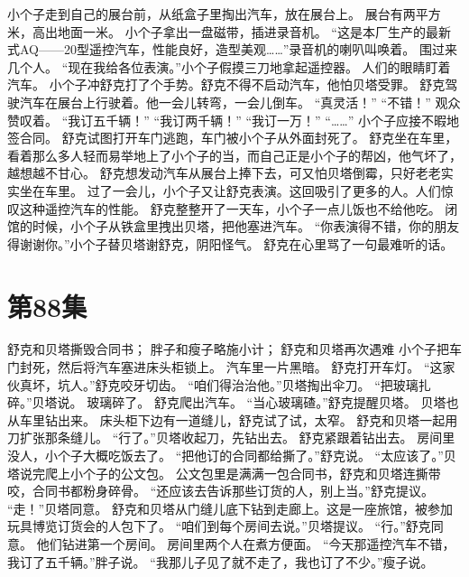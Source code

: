 \documentclass[a4paper,12pt,UTF8,twoside]{ctexbook}
\begin{document}
        小个子走到自己的展台前，从纸盒子里掏出汽车，放在展台上。 
        展台有两平方米，高出地面一米。 
        小个子拿出一盘磁带，插进录音机。 
        “这是本厂生产的最新式AQ——20型遥控汽车，性能良好，造型美观……”录音机的喇叭叫唤着。 
        围过来几个人。 
        “现在我给各位表演。”小个子假摸三刀地拿起遥控器。 
        人们的眼睛盯着汽车。 
        小个子冲舒克打了个手势。舒克不得不启动汽车，他怕贝塔受罪。 
        舒克驾驶汽车在展台上行驶着。他一会儿转弯，一会儿倒车。 
        “真灵活！” 
        “不错！” 
        观众赞叹着。 
        “我订五千辆！” 
        “我订两千辆！” 
        “我订一万！” 
        “……” 
        小个子应接不暇地签合同。 
        舒克试图打开车门逃跑，车门被小个子从外面封死了。 
        舒克坐在车里，看着那么多人轻而易举地上了小个子的当，而自己正是小个子的帮凶，他气坏了，越想越不甘心。 
        舒克想发动汽车从展台上捧下去，可又怕贝塔倒霉，只好老老实实坐在车里。 
        过了一会儿，小个子又让舒克表演。这回吸引了更多的人。人们惊叹这种遥控汽车的性能。 
        舒克整整开了一天车，小个子一点儿饭也不给他吃。 
        闭馆的时候，小个子从铁盒里拽出贝塔，把他塞进汽车。 
        “你表演得不错，你的朋友得谢谢你。”小个子替贝塔谢舒克，阴阳怪气。 
        舒克在心里骂了一句最难听的话。       \chapter{第88集} 
        舒克和贝塔撕毁合同书； 
        胖子和瘦子略施小计； 
        舒克和贝塔再次遇难   
        小个子把车门封死，然后将汽车塞进床头柜锁上。 
        汽车里一片黑暗。 
        舒克打开车灯。 
        “这家伙真坏，坑人。”舒克咬牙切齿。 
        “咱们得治治他。”贝塔掏出伞刀。 
        “把玻璃扎碎。”贝塔说。 
        玻璃碎了。 
        舒克爬出汽车。 
        “当心玻璃碴。”舒克提醒贝塔。 
        贝塔也从车里钻出来。 
        床头柜下边有一道缝儿，舒克试了试，太窄。 
        舒克和贝塔一起用刀扩张那条缝儿。 
        “行了。”贝塔收起刀，先钻出去。 
        舒克紧跟着钻出去。 
        房间里没人，小个子大概吃饭去了。 
        “把他订的合同都给撕了。”舒克说。 
        “太应该了。”贝塔说完爬上小个子的公文包。 
        公文包里是满满一包合同书，舒克和贝塔连撕带咬，合同书都粉身碎骨。 
        “还应该去告诉那些订货的人，别上当。”舒克提议。 
        “走！”贝塔同意。 
        舒克和贝塔从门缝儿底下钻到走廊上。这是一座旅馆，被参加玩具博览订货会的人包下了。 
        “咱们到每个房间去说。”贝塔提议。 
        “行。”舒克同意。 
        他们钻进第一个房间。 
        房间里两个人在煮方便面。 
        “今天那遥控汽车不错，我订了五千辆。”胖子说。 
        “我那儿子见了就不走了，我也订了不少。”瘦子说。 
\end{document}
